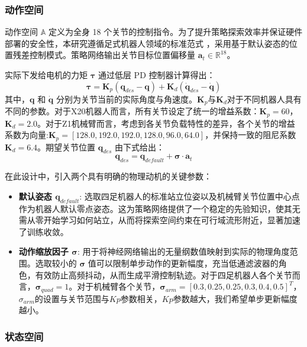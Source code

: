 \subsubsection{动作空间}

动作空间 $\mathbb{A}$ 定义为全身 18 个关节的控制指令。为了提升策略探索效率并保证硬件部署的安全性，本研究遵循足式机器人领域的标准范式 \cite{hwangbo2019learning, lee2020learning}，采用基于默认姿态的位置残差控制模式。策略网络输出关节目标位置偏移量 $\mathbf{a}_t \in \mathbb{R}^{18}$。

实际下发给电机的力矩 $\boldsymbol{\tau}$ 通过低层 PD 控制器计算得出：
\begin{equation}
    \boldsymbol{\tau} = \mathbf{K}_p (\mathbf{q}_{des} - \mathbf{q}) + \mathbf{K}_d (\dot{\mathbf{q}}_{des} - \dot{\mathbf{q}})
\end{equation}
其中，$\mathbf{q}$ 和 $\dot{\mathbf{q}}$ 分别为关节当前的实际角度与角速度。$\mathbf{K}_p$与$\mathbf{K}_d$对于不同机器人具有不同的参数。对于X20机器人而言，所有关节设定了统一的增益系数：$\mathbf{K}_p=60$，$\mathbf{K}_d=2.0$。对于Z1机械臂而言，考虑到各关节负载特性的差异，各个关节的增益系数为向量:$\mathbf{K}_p = [128.0, 192.0, 192.0, 128.0, 96.0, 64.0]$，并保持一致的阻尼系数$\mathbf{K}_d=6.4$。期望关节位置 $\mathbf{q}_{des}$ 由下式给出：
\begin{equation}
    \mathbf{q}_{des} = \mathbf{q}_{default} + \boldsymbol{\sigma} \cdot \mathbf{a}_t
\end{equation}

在此设计\cite{peng2017learning,tan2018sim,kumar2021rma}中，引入两个具有明确的物理动机的关键参数：
\begin{itemize}
    \item \textbf{默认姿态 $\mathbf{q}_{default}$}: 选取四足机器人的标准站立位姿以及机械臂关节位置中心点作为机器人默认零点姿态。这为策略网络提供了一个稳定的先验知识，使其无需从零开始学习如何站立，从而将探索空间约束在可行域流形附近，显著加速了训练收敛。
    \item \textbf{动作缩放因子 $\boldsymbol{\sigma}$}: 用于将神经网络输出的无量纲数值映射到实际的物理角度范围。选取较小的 $\boldsymbol{\sigma}$ 值可以限制单步动作的更新幅度，充当低通滤波器的角色，有效防止高频抖动，从而生成平滑控制轨迹。对于四足机器人各个关节而言，$\boldsymbol{\sigma}_{quad}=1$。对于机械臂各个关节，$\boldsymbol{\sigma}_{arm}=[0.3, 0.25, 0.25, 0.3, 0.4, 0.5]^T$，$\sigma_{arm}$的设置与关节范围与$Kp$参数相关，$Kp$参数越大，我们希望单步更新幅度越小。
\end{itemize}

\subsubsection{状态空间}


